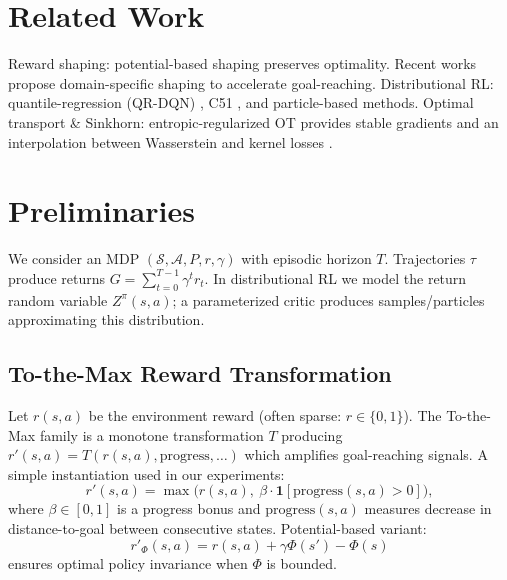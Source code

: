 \documentclass{article}
\begin{document}
\section{Related Work}
Reward shaping: potential-based shaping \cite{ng1999policy} preserves optimality. Recent works propose domain-specific shaping to accelerate goal-reaching. Distributional RL: quantile-regression (QR-DQN) \cite{dabney2018distributional}, C51 \cite{bellemare2017distributional}, and particle-based methods. Optimal transport \& Sinkhorn: entropic-regularized OT provides stable gradients and an interpolation between Wasserstein and kernel losses \cite{feydy2019interpolating}.

\section{Preliminaries}
We consider an MDP $(\mathcal{S},\mathcal{A},P,r,\gamma)$ with episodic horizon $T$. Trajectories $\tau$ produce returns $G=\sum_{t=0}^{T-1}\gamma^t r_t$. In distributional RL we model the return random variable $Z^\pi(s,a)$; a parameterized critic produces samples/particles approximating this distribution.

\subsection{To-the-Max Reward Transformation}
Let $r(s,a)$ be the environment reward (often sparse: $r\in\{0,1\}$). The To-the-Max family is a monotone transformation $T$ producing $r'(s,a)=T(r(s,a),\text{progress},\ldots)$ which amplifies goal-reaching signals. A simple instantiation used in our experiments:
\begin{equation}
r'(s,a) = \max\big(r(s,a),\ \beta\cdot \mathbf{1}[\text{progress}(s,a)>0]\big),
\label{eq:to_max}
\end{equation}
where $\beta\in[0,1]$ is a progress bonus and $\text{progress}(s,a)$ measures decrease in distance-to-goal between consecutive states. Potential-based variant:
\begin{equation}
r'_{\Phi}(s,a) = r(s,a) + \gamma\Phi(s') - \Phi(s)
\label{eq:potential_shaping}
\end{equation}
ensures optimal policy invariance \cite{ng1999policy} when $\Phi$ is bounded.
\end{document}

